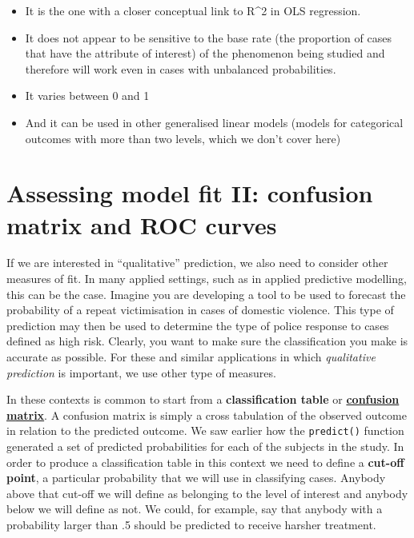 \documentclass[
]{book}
\begin{document}
\begin{itemize}
\item
  It is the one with a closer conceptual link to R\^{}2 in OLS regression.
\item
  It does not appear to be sensitive to the base rate (the proportion of cases that have the attribute of interest) of the phenomenon being studied and therefore will work even in cases with unbalanced probabilities.
\item
  It varies between 0 and 1
\item
  And it can be used in other generalised linear models (models for categorical outcomes with more than two levels, which we don't cover here)
\end{itemize}

\section{Assessing model fit II: confusion matrix and ROC curves}\label{assessing-model-fit-ii-confusion-matrix-and-roc-curves}

If we are interested in ``qualitative'' prediction, we also need to consider other measures of fit. In many applied settings, such as in applied predictive modelling, this can be the case. Imagine you are developing a tool to be used to forecast the probability of a repeat victimisation in cases of domestic violence. This type of prediction may then be used to determine the type of police response to cases defined as high risk. Clearly, you want to make sure the classification you make is accurate as possible. For these and similar applications in which \emph{qualitative prediction} is important, we use other type of measures.

In these contexts is common to start from a \textbf{classification table} or \href{http://en.wikipedia.org/wiki/Confusion_matrix}{\textbf{confusion matrix}}. A confusion matrix is simply a cross tabulation of the observed outcome in relation to the predicted outcome. We saw earlier how the \texttt{predict()} function generated a set of predicted probabilities for each of the subjects in the study. In order to produce a classification table in this context we need to define a \textbf{cut-off point}, a particular probability that we will use in classifying cases. Anybody above that cut-off we will define as belonging to the level of interest and anybody below we will define as not. We could, for example, say that anybody with a probability larger than .5 should be predicted to receive harsher treatment.
\end{document}
